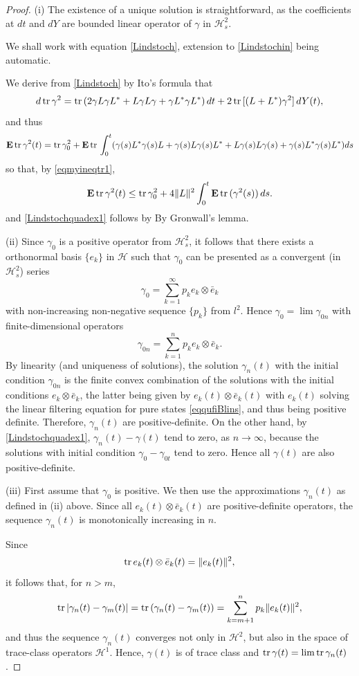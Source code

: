 \documentclass[12pt]{article}
\def\HC{\mathcal{H}}
\def\E{\mathbf{E}}
\def\tr{\rm{tr}}
\def\ga{\gamma}
\begin{document}
\begin{proof}
(i) The existence of a unique solution is straightforward, as the coefficients at $dt$ and $dY$ are
bounded linear operator of $\ga$ in $\HC^2_s$.

We shall work with equation \eqref{Lindstoch}, extension to  \eqref{Lindstochin} being automatic.

We derive from
\eqref{Lindstoch} by Ito's formula that
\begin{equation}
\label{Lindstochquadtr}
d \, {\tr}\, \ga^2={\tr} \,(2\ga L\ga L^*+ L \ga L \ga + \ga L^* \ga L^*) \, dt
+2\, {\tr} \, [(L+L^*)\ga^2] \, dY(t),
\end{equation}
and thus
\[
\E \, {\tr}\, \ga^2(t)
={\tr}\, \ga_0^2 +\E \, {\tr} \,
\int_0^t (\ga(s) L^*\ga(s) L+\ga(s) L\ga(s) L^*+ L \ga(s) L \ga(s) + \ga(s) L^* \ga(s) L^*) ds
\]
so that, by \eqref{eqmyineqtr1},
\[
\E \, {\tr}\, \ga^2(t) \le {\tr}\, \ga_0^2+ 4 \|L\|^2 \int_0^t  \E \, {\tr} \,(\ga^2(s)) \, ds.
\]
and \eqref{Lindstochquadex1} follows by By Gronwall's lemma.

 (ii) Since $\ga_0$ is a positive operator from $\HC^2_s$, it follows that
  there exists a orthonormal basis $\{e_k\}$ in $\HC$ such that $\ga_0$
 can be presented as a convergent (in $\HC^2_s$) series
 \[
 \ga_0=\sum_{k=1}^{\infty} p_k e_k\otimes \bar e_k
 \]
 with non-increasing non-negative sequence $\{p_k\}$ from $l^2$. Hence $\ga_0=\lim \ga_{0n}$
 with finite-dimensional operators
 \[
 \ga_{0n}=\sum_{k=1}^n p_k e_k\otimes \bar e_k.
 \]
By linearity (and uniqueness of solutions), the solution $\ga_n(t)$ with the initial condition $\ga_{0n}$ is the finite
convex combination of the solutions with the initial conditions $e_k\otimes \bar e_k$, the latter
being given by $e_k(t)\otimes \bar e_k(t)$ with $e_k(t)$ solving the linear filtering equation for
pure states \eqref{eqqufiBlins}, and thus being positive definite. Therefore, $\ga_n(t)$ are positive-definite.
On the other hand, by \eqref{Lindstochquadex1}, $\ga_n(t)-\ga(t)$ tend to zero, as $n\to \infty$,
because the solutions with initial condition $\ga_0-\ga_{0t}$ tend to zero. Hence all $\ga (t)$ are
also positive-definite.

(iii) First assume that $\ga_0$ is positive. We then use the approximations
$\ga_n(t)$ as defined in (ii) above.
Since all $e_k(t)\otimes \bar e_k(t)$ are positive-definite operators,
the sequence $\ga_n(t)$ is monotonically increasing in $n$.

Since
\begin{equation}
\label{tracenormsq}
{\tr} \, e_k(t)\otimes \bar e_k(t)=\|e_k(t)\|^2,
\end{equation}
it follows that, for $n>m$,
\[
{\tr}\, |\ga_n(t)-\ga_m(t)|={\tr}\, (\ga_n(t)-\ga_m(t))
=\sum_{k=m+1}^n p_k \|e_k(t)\|^2,
\]
and thus the sequence $\ga_n(t)$ converges not only in $\HC^2$, but also in
the space of trace-class operators $\HC^1$. Hence, $\ga(t)$ is of trace class and
${\tr }\, \ga(t)=\lim {\tr}\, \ga_n(t)$.


\end{proof}
\end{document}
